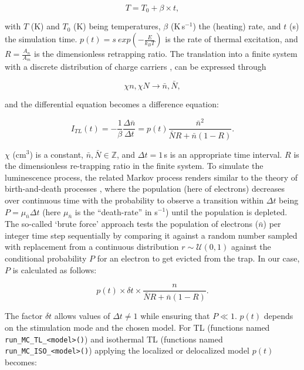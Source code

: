 \begin{equation}
T = T_{0} + \beta \times t,
\end{equation}

\noindent{}with \(T\) (K) and \(T_{0}\) (K) being temperatures, \(\beta\)
(K\(\,\)s\(^{-1}\)) the (heating) rate, and \(t\) (s) the simulation
time. \(p(t) = s~exp(-\frac{E}{k_{B}T})\) is the rate of thermal
excitation, and \(R = \frac{A_{n}}{A_{m}}\) is the dimensionless
retrapping ratio. The translation into a finite system with a discrete
distribution of charge carriers
\citep[cf.][]{Mandowski:1991ha, Mandowski:1994fi}, can be expressed
through

\begin{equation}
\chi n,\chi N \rightarrow{} \bar{n}, \bar{N},
\end{equation}

\noindent{}and the differential equation becomes a difference equation:

\begin{equation}
I_{TL}(t) = -\frac{1}{\beta}\frac{\Delta \bar{n}}{\Delta t} = p(t) \frac{\bar{n}^2}{\bar{N}R + \bar{n}(1-R)}. 
\end{equation}

\noindent{}\(\chi\) (cm\(^3\)) is a constant, \(\bar{n},\bar{N} \in \mathbb{Z}\),
and \(\Delta t = 1\,\)s is an appropriate time interval. \(R\) is the
dimensionless re-trapping ratio in the finite system. To simulate the
luminescence process, the related Markov process renders similar to the
theory of birth-and-death processes \citep[e.g.,][]{Novozhilov:2006hd},
where the population (here of electrons) decreases over continuous time
with the probability to observe a transition within \(\Delta t\) being
\(P = \mu_{\bar{n}} \Delta t\) (here \(\mu_{\bar{n}}\) is the
``death-rate'' in s\(^{-1}\)) until the population is depleted. The
so-called `brute force' approach \citep[e.g.,][]{Landau:2015vp} tests
the population of electrons (\(\bar{n}\)) per integer time
step sequentially by comparing it against a random number sampled with replacement
from a continuous distribution \(r \sim \mathcal{U}(0,1)\) against the
conditional probability \(P\) for an electron to get evicted from the
trap. In our case, \(P\) is calculated as follows:

\begin{equation}
p(t) \times \delta t \times \frac{n}{\bar{N}R + \bar{n}(1-R)}.
\end{equation}

The factor \(\delta t\) allows values of \(\Delta t \neq 1\) while
ensuring that \(P \ll 1\). \(p(t)\) depends on the stimulation mode and
the chosen model. For TL (functions named
\texttt{run\_MC\_TL\_\textless{}model\textgreater{}()}) and isothermal
TL (functions named
\texttt{run\_MC\_ISO\_\textless{}model\textgreater{}()}) applying the
localized or delocalized model \(p(t)\) becomes:


